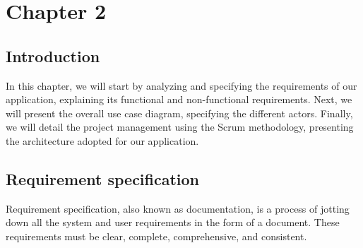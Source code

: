 

\chapter*{Chapter 2}






\vspace{0.25cm}

\setcounter{tocdepth}{1}
\headrule


\localtableofcontents
\newpage


\setcounter{chapter}{2}
\setcounter{section}{0}
\setcounter{table}{0} %
\setcounter{figure}{0} 


\section*{Introduction}

In this chapter, we will start by analyzing and specifying the requirements of our application, explaining its functional and non-functional requirements. Next, we will present the overall use case diagram, specifying the different actors. Finally, we will detail the project management using the Scrum methodology, presenting the architecture adopted for our application.



\section{Requirement specification}
Requirement specification, also known as documentation, is a process of jotting down all the system and user requirements in the form of a document. These requirements must be clear, complete, comprehensive, and consistent. \cite{VISURE}
